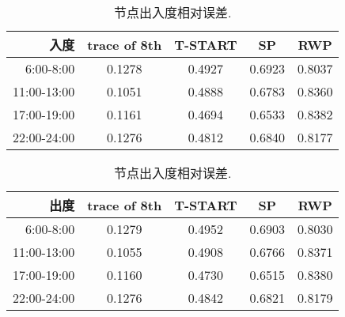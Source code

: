 \begin{table}[t]
\caption{节点出入度相对误差.}\label{table_relative_err}
\centering
\begin{tabular}{r|c|c|c|c}
\hline
	入度 &trace of 8th	&T-START &SP &RWP\\
\hline
 6:00-8:00&
0.1278&	0.4927&	0.6923&	0.8037\\ 
 11:00-13:00&
0.1051&	0.4888&	0.6783&	0.8360\\
 17:00-19:00&
0.1161&	0.4694&	0.6533&	0.8382\\
 22:00-24:00&
0.1276&	0.4812&	0.6840&	0.8177\\
\hline
\end{tabular}

\begin{tabular}{r|c|c|c|c}
\hline
	出度 &trace of 8th	&T-START &SP&RWP\\
\hline
 6:00-8:00&
0.1279&	0.4952&	0.6903&	0.8030\\
 11:00-13:00&
0.1055&	0.4908&	0.6766&	0.8371\\
 17:00-19:00&
0.1160&	0.4730&	0.6515&	0.8380\\
 22:00-24:00&
0.1276&	0.4842&	0.6821&	0.8179\\
\hline
\end{tabular}
\end{table}